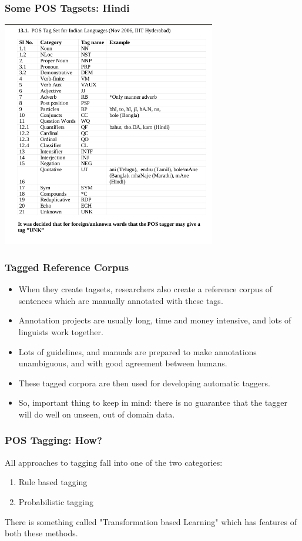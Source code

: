 \documentclass{beamer}
\begin{document}
\begin{frame}
\frametitle{Some POS Tagsets: Hindi}
\includegraphics[width=0.7\textwidth]{poshindi.png}
\end{frame}

\begin{frame}
\frametitle{Tagged Reference Corpus}
\begin{itemize}
\item When they create tagsets, researchers also create a reference corpus of sentences which are manually annotated with these tags.
\item Annotation projects are usually long, time and money intensive, and lots of linguists work together.
\item Lots of guidelines, and manuals are prepared to make annotations unambiguous, and with good agreement between humans.
\item These tagged corpora are then used for developing automatic taggers.
\item So, important thing to keep in mind: there is no guarantee that the tagger will do well on unseen, out of domain data.
\end{itemize}
\end{frame}

\begin{frame}
\frametitle{POS Tagging: How?}
All approaches to tagging fall into one of the two categories: 
\begin{enumerate}
\item Rule based tagging
\item Probabilistic tagging
\end{enumerate}
There is something called "Transformation based Learning" which has features of both these methods.
\end{frame}
\end{document}
